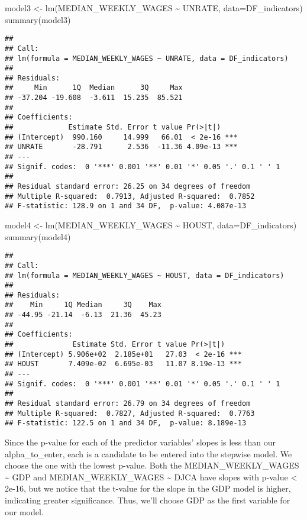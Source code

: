 \documentclass[
]{article}
\newenvironment{Shaded}{\begin{snugshade}}{\end{snugshade}}
\newcommand{\AttributeTok}[1]{\textcolor[rgb]{0.77,0.63,0.00}{#1}}
\newcommand{\FunctionTok}[1]{\textcolor[rgb]{0.00,0.00,0.00}{#1}}
\newcommand{\NormalTok}[1]{#1}
\newcommand{\OtherTok}[1]{\textcolor[rgb]{0.56,0.35,0.01}{#1}}
\newcommand{\SpecialCharTok}[1]{\textcolor[rgb]{0.00,0.00,0.00}{#1}}
\begin{document}
\begin{Shaded}
\begin{Highlighting}[]
\NormalTok{model3 }\OtherTok{\textless{}{-}} \FunctionTok{lm}\NormalTok{(MEDIAN\_WEEKLY\_WAGES }\SpecialCharTok{\textasciitilde{}}\NormalTok{ UNRATE, }\AttributeTok{data=}\NormalTok{DF\_indicators)}
\FunctionTok{summary}\NormalTok{(model3)}
\end{Highlighting}
\end{Shaded}

\begin{verbatim}
## 
## Call:
## lm(formula = MEDIAN_WEEKLY_WAGES ~ UNRATE, data = DF_indicators)
## 
## Residuals:
##     Min      1Q  Median      3Q     Max 
## -37.204 -19.608  -3.611  15.235  85.521 
## 
## Coefficients:
##             Estimate Std. Error t value Pr(>|t|)    
## (Intercept)  990.160     14.999   66.01  < 2e-16 ***
## UNRATE       -28.791      2.536  -11.36 4.09e-13 ***
## ---
## Signif. codes:  0 '***' 0.001 '**' 0.01 '*' 0.05 '.' 0.1 ' ' 1
## 
## Residual standard error: 26.25 on 34 degrees of freedom
## Multiple R-squared:  0.7913, Adjusted R-squared:  0.7852 
## F-statistic: 128.9 on 1 and 34 DF,  p-value: 4.087e-13
\end{verbatim}

\begin{Shaded}
\begin{Highlighting}[]
\NormalTok{model4 }\OtherTok{\textless{}{-}} \FunctionTok{lm}\NormalTok{(MEDIAN\_WEEKLY\_WAGES }\SpecialCharTok{\textasciitilde{}}\NormalTok{ HOUST, }\AttributeTok{data=}\NormalTok{DF\_indicators)}
\FunctionTok{summary}\NormalTok{(model4)}
\end{Highlighting}
\end{Shaded}

\begin{verbatim}
## 
## Call:
## lm(formula = MEDIAN_WEEKLY_WAGES ~ HOUST, data = DF_indicators)
## 
## Residuals:
##    Min     1Q Median     3Q    Max 
## -44.95 -21.14  -6.13  21.36  45.23 
## 
## Coefficients:
##              Estimate Std. Error t value Pr(>|t|)    
## (Intercept) 5.906e+02  2.185e+01   27.03  < 2e-16 ***
## HOUST       7.409e-02  6.695e-03   11.07 8.19e-13 ***
## ---
## Signif. codes:  0 '***' 0.001 '**' 0.01 '*' 0.05 '.' 0.1 ' ' 1
## 
## Residual standard error: 26.79 on 34 degrees of freedom
## Multiple R-squared:  0.7827, Adjusted R-squared:  0.7763 
## F-statistic: 122.5 on 1 and 34 DF,  p-value: 8.189e-13
\end{verbatim}

Since the p-value for each of the predictor variables' slopes is less
than our alpha\_to\_enter, each is a candidate to be entered into the
stepwise model. We choose the one with the lowest p-value. Both the
MEDIAN\_WEEKLY\_WAGES \textasciitilde{} GDP and MEDIAN\_WEEKLY\_WAGES
\textasciitilde{} DJCA have slopes with p-value \textless{} 2e-16, but
we notice that the t-value for the slope in the GDP model is higher,
indicating greater significance. Thus, we'll choose GDP as the first
variable for our model.
\end{document}
